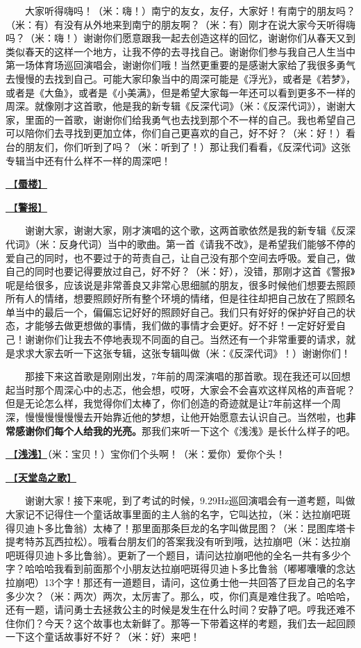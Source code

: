 \documentclass[]{ctexbook}
\begin{document}
  大家听得嗨吗！（米：嗨！）南宁的友女，友仔，大家好！有南宁的朋友吗？（米：有）有没有从外地来到南宁的朋友啊？（米：有）刚才在说大家今天听得嗨吗？（米：嗨！）谢谢你们愿意跟我一起去创造这样的回忆，谢谢你们从春天又到类似春天的这样一个地方，让我不停的去寻找自己。谢谢你们参与我自己人生当中第一场体育场巡回演唱会，谢谢你们哦！当然更重要的是感谢大家给了我很多勇气去慢慢的去找到自己。可能大家印象当中的周深可能是《浮光》，或者是《若梦》，或者是《大鱼》，或者是《小美满》，但是希望大家每一年还可以看到更多不一样的周深。就像刚才这首歌，他是我的新专辑《反深代词》（米：《反深代词》），谢谢大家，里面的一首歌，谢谢你们给我勇气也去找到那个不一样的自己。我也希望自己可以陪你们去寻找到更加立体，你们自己更喜欢的自己，好不好？（米：好！）看台的朋友们，你们听到了吗？（米：听到了！）那让我们看看，《反深代词》这张专辑当中还有什么样不一样的周深吧！

\hyperref[mirage]{🎵【\textbf{蜃楼}】}

\hyperref[the-giver]{🎵【\textbf{警报}】}

  谢谢大家，谢谢大家，刚才演唱的这个歌，这两首歌依然是我的新专辑《反深代词》（米：反身代词）当中的歌曲。第一首《请我不改》，是希望我们能够不停的爱自己的同时，也不要过于的苛责自己，让自己没有那个空间去呼吸。爱自己，做自己的同时也要记得要放过自己，好不好？（米：好），没错，那刚才这首《警报》呢是给很多，应该说是非常善良又非常心思细腻的朋友，很多时候他们想要去照顾所有人的情绪，想要照顾好所有整个环境的情绪，但是往往却把自己放在了照顾名单当中的最后一个，偏偏忘记好好的照顾好自己。我们只有好好的保护好自己的状态，才能够去做更想做的事情，我们做的事情才会更好。好不好！一定好好爱自己！谢谢你们让我去不停地表现不同面的自己。当然还有一个非常重要的请求，就是求求大家去听一下这张专辑，这张专辑叫做（米：《反深代词》！）谢谢你们！

  那接下来这首歌是刚刚出发，7年前的周深演唱的那首歌。现在我还可以回想起当时那个周深心中的忐忑，他会想，哎呀，大家会不会喜欢这样风格的声音呢？但是无论怎么样，我觉得你们太棒了，你们创造的奇迹就是让7年前这样一个周深，慢慢慢慢慢慢去开始靠近他的梦想，让他开始愿意去认识自己。当然啦，也\textbf{非常感谢你们每个人给我的光亮。}那我们来听一下这个《浅浅》是长什么样子的吧。

\hyperref[qianqian]{🎵【\textbf{浅浅}】}（米：宝贝！）宝你们个头啊！（米：爱你）爱你个头！

\hyperref[haven-song]{🎵【\textbf{天堂岛之歌}】}

  谢谢大家！接下来呢，到了考试的时候，9.29Hz巡回演唱会有一道考题，叫做大家记不记得住一个童话故事里面的主人翁的名字，它叫达拉，（米：达拉崩吧斑得贝迪卜多比鲁翁）太棒了！那里面那条巨龙的名字叫做昆图？（米：昆图库塔卡提考特苏瓦西拉松）。哦看台朋友们的答案我没有听到哦，达拉崩吧（米：达拉崩吧斑得贝迪卜多比鲁翁）。更新了一个题目，请问达拉崩吧他的全名一共有多少个字？哈哈哈我看到前面那个小朋友达拉崩吧斑得贝迪卜多比鲁翁（嘟嘟囔囔的念达拉崩吧）13个字！那还有一道题目，请问，这位勇士他一共回答了巨龙自己的名字多少次？（米：两次）两次，太厉害了。那么，哎，你们真是难住我了。哈哈哈，还有一题，请问勇士去拯救公主的时候是发生在什么时间？安静了吧。哼我还难不住你们？今天？这个故事也太新鲜了。那等一下带着这样的考题，我们去一起回顾一下这个童话故事好不好？（米：好）来吧！
\end{document}
